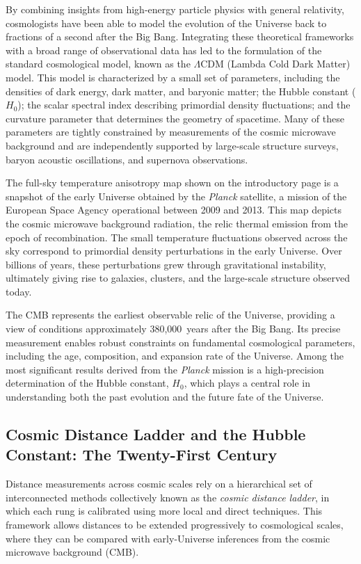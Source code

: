 By combining insights from high-energy particle physics with general relativity, cosmologists have been able to model the evolution of the Universe back to fractions of a second after the Big Bang. Integrating these theoretical frameworks with a broad range of observational data has led to the formulation of the standard cosmological model, known as the $\Lambda$CDM (Lambda Cold Dark Matter) model. This model is characterized by a small set of parameters, including the densities of dark energy, dark matter, and baryonic matter; the Hubble constant ($H_0$); the scalar spectral index describing primordial density fluctuations; and the curvature parameter that determines the geometry of spacetime. Many of these parameters are tightly constrained by measurements of the cosmic microwave background and are independently supported by large-scale structure surveys, baryon acoustic oscillations, and supernova observations.

The full-sky temperature anisotropy map shown on the introductory page is a snapshot of the early Universe obtained by the \emph{Planck} satellite, a mission of the European Space Agency operational between 2009 and 2013. This map depicts the cosmic microwave background radiation, the relic thermal emission from the epoch of recombination. The small temperature fluctuations observed across the sky correspond to primordial density perturbations in the early Universe. Over billions of years, these perturbations grew through gravitational instability, ultimately giving rise to galaxies, clusters, and the large-scale structure observed today.

The CMB represents the earliest observable relic of the Universe, providing a view of conditions approximately 380{,}000~years after the Big Bang. Its precise measurement enables robust constraints on fundamental cosmological parameters, including the age, composition, and expansion rate of the Universe. Among the most significant results derived from the \emph{Planck} mission is a high-precision determination of the Hubble constant, $H_0$, which plays a central role in understanding both the past evolution and the future fate of the Universe.

\subsection{Cosmic Distance Ladder and the Hubble Constant: The Twenty-First Century}

Distance measurements across cosmic scales rely on a hierarchical set of interconnected methods collectively known as the \emph{cosmic distance ladder}, in which each rung is calibrated using more local and direct techniques. This framework allows distances to be extended progressively to cosmological scales, where they can be compared with early-Universe inferences from the cosmic microwave background (CMB).

